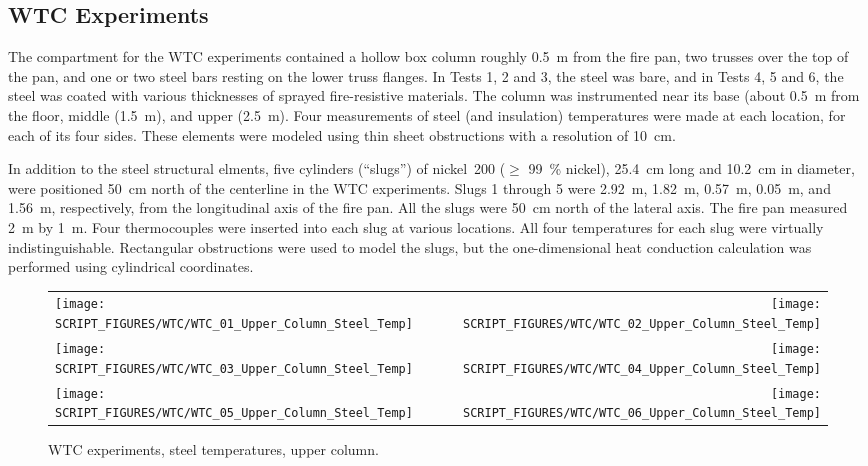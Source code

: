 \clearpage

\subsection{WTC Experiments}

The compartment for the WTC experiments contained a hollow box column roughly 0.5~m from the fire pan, two trusses over the top of the pan, and one or two steel bars resting on the lower truss flanges. In Tests 1, 2 and 3, the steel was bare, and in Tests 4, 5 and 6, the steel was coated with various thicknesses of sprayed fire-resistive materials. The column was instrumented near its base (about 0.5~m from the floor, middle (1.5~m), and upper (2.5~m). Four measurements of steel (and insulation) temperatures were made at each location, for each of its four sides. These elements were modeled using thin sheet obstructions with a resolution of 10~cm.

In addition to the steel structural elments, five cylinders (``slugs'') of nickel~200 ($\ge$ 99~\% nickel), 25.4~cm long and 10.2~cm in diameter, were positioned 50~cm north of the centerline in the WTC experiments. Slugs 1 through 5 were 2.92~m, 1.82~m, 0.57~m, 0.05~m, and 1.56~m, respectively, from the longitudinal axis of the fire pan. All the slugs were 50~cm north of the lateral axis. The fire pan measured 2~m by 1~m. Four thermocouples were inserted into each slug at various locations. All four temperatures for each slug were virtually indistinguishable. Rectangular obstructions were used to model the slugs, but the one-dimensional heat conduction calculation was performed using cylindrical coordinates.

\newpage

\begin{figure}[p]
\begin{tabular*}{\textwidth}{l@{\extracolsep{\fill}}r}
\texttt{[image: SCRIPT\_FIGURES/WTC/WTC\_01\_Upper\_Column\_Steel\_Temp]} &
\texttt{[image: SCRIPT\_FIGURES/WTC/WTC\_02\_Upper\_Column\_Steel\_Temp]} \\
\texttt{[image: SCRIPT\_FIGURES/WTC/WTC\_03\_Upper\_Column\_Steel\_Temp]} &
\texttt{[image: SCRIPT\_FIGURES/WTC/WTC\_04\_Upper\_Column\_Steel\_Temp]} \\
\texttt{[image: SCRIPT\_FIGURES/WTC/WTC\_05\_Upper\_Column\_Steel\_Temp]} &
\texttt{[image: SCRIPT\_FIGURES/WTC/WTC\_06\_Upper\_Column\_Steel\_Temp]}
\end{tabular*}
\caption{WTC experiments, steel temperatures, upper column.}
\label{NIST_WTC_Upper_Column_Steel}
\end{figure}

